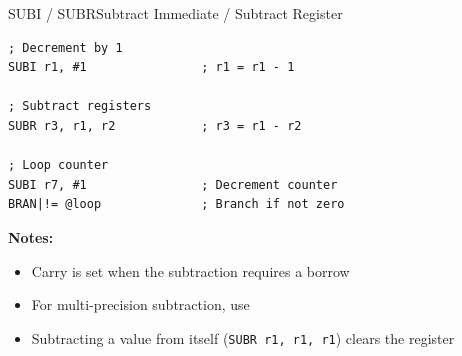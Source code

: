\begin{instructionbox}{SUBI / SUBR}{Subtract Immediate / Subtract Register}
	\begin{example}
		\begin{lstlisting}
; Decrement by 1
SUBI r1, #1                ; r1 = r1 - 1

; Subtract registers
SUBR r3, r1, r2            ; r3 = r1 - r2

; Loop counter
SUBI r7, #1                ; Decrement counter
BRAN|!= @loop              ; Branch if not zero
		\end{lstlisting}
		\caption{Basic Subtraction and Loop Counting}
	\end{example}

	\textbf{Notes:}
	\begin{itemize}
		\item Carry is set when the subtraction requires a borrow
		\item For multi-precision subtraction, use 
		\item Subtracting a value from itself (\texttt{SUBR r1, r1, r1}) clears the register
	\end{itemize}
\end{instructionbox}

